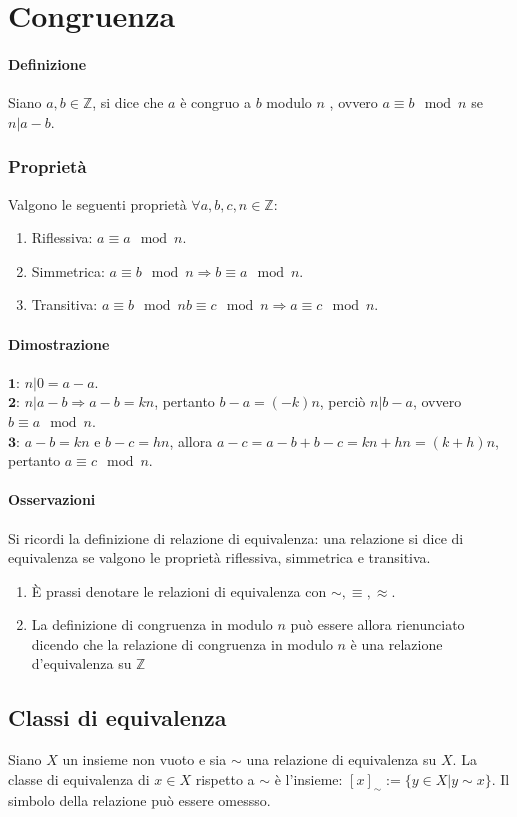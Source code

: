 \chapter{Congruenza}
\subsubsection{Definizione}
Siano $a,b\in\mathbb{Z}$, si dice che $a$ \`e congruo a $b$ modulo $n$ , ovvero $a\equiv b\mod n$ se $n|a-b$.
\subsection{Propriet\`a}
Valgono le seguenti propriet\`a $\forall a,b,c,n\in\mathbb{Z}$:
\begin{enumerate}
\item Riflessiva: $a\equiv a\mod n$.
\item Simmetrica: $a\equiv b\mod n\Rightarrow b\equiv a\mod n$.
\item Transitiva: $a\equiv b\mod n b\equiv c\mod n\Rightarrow a\equiv c\mod n$.
\end{enumerate}
\subsubsection{Dimostrazione}
$\mathbf{1}$: $n|0=a-a$.\\
$\mathbf{2}$: $n|a-b\Rightarrow a-b=kn$, pertanto $b-a=(-k)n$, perci\`o $n|b-a$, ovvero $b\equiv a\mod n$.\\
$\mathbf{3}$: $a-b=kn$ e $b-c=hn$, allora $a-c=a-b+b-c=kn+hn=(k+h)n$, pertanto $a\equiv c\mod n$.
\subsubsection{Osservazioni}
Si ricordi la definizione di relazione di equivalenza: una relazione si dice di equivalenza se valgono le propriet\`a riflessiva, simmetrica e transitiva.
\begin{enumerate}
\item \`E prassi denotare le relazioni di equivalenza con $\sim,\equiv, \approx$.
\item La definizione di congruenza in modulo $n$ pu\`o essere allora rienunciato dicendo che la relazione di congruenza in modulo $n$ \`e una relazione d'equivalenza su 
$\mathbb{Z}$
\end{enumerate}
\section{Classi di equivalenza}
Siano $X$ un insieme non vuoto e sia $\sim$ una relazione di equivalenza su $X$. La classe di equivalenza di $x\in X$ rispetto a $\sim$ \`e l'insieme: $[x]_{\sim}:=\{y\in X|y
\sim x\}$. Il simbolo della relazione pu\`o essere omessso. 
